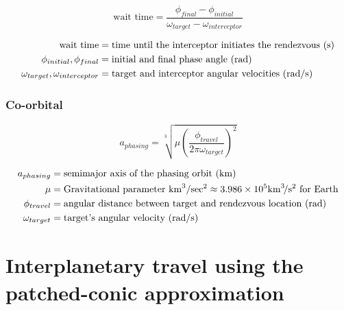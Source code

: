 \documentclass{article}
\newcommand{\myvarmukm}{\mu &= \text{Gravitational parameter \si{\kilo\meter\cubed\per\sec\squared}} \approx 3.986 \times 10^5 \si{\kilo\meter\cubed\per\second\squared} \text{ for Earth}}
\begin{document}
\begin{multicols}{3}
	\begin{equation*}
	\boxed{\text{wait time} = \dfrac{\phi_{final} - \phi_{initial}}{\omega_{target} - \omega_{interceptor}}}
	\end{equation*}
	
	\vfill\null
	\columnbreak
	\begin{align*}
	\text{wait time} &= \text{time until the interceptor initiates the rendezvous (\si{\second})}\\
	\phi_{initial}, \phi_{final} &= \text{initial and final phase angle (\si{\radian})}\\
	\omega_{target}, \omega_{interceptor} &= \text{target and interceptor angular velocities (\si{\radian\per\second})}\\
	\end{align*}
\end{multicols}

\subsubsection{Co-orbital}
\begin{multicols}{3}
	\begin{equation*}
	\boxed{a_{phasing} = \sqrt[3]{\mu\left(\dfrac{\phi_{travel}}{2\pi\omega_{target}}\right)^2}}
	\end{equation*}
	
	\vfill\null
	\columnbreak
	\begin{align*}
	a_{phasing} &= \text{semimajor axis of the phasing orbit (\si{\kilo\meter})}\\
	\myvarmukm\\
	\phi_{travel} &= \text{angular distance between target and rendezvous location (\si{\radian})}\\
	\omega_{target} &= \text{target's angular velocity (\si{\radian\per\second})}\\
	\end{align*}
\end{multicols}

\section{Interplanetary travel using the patched-conic approximation}
\end{document}
